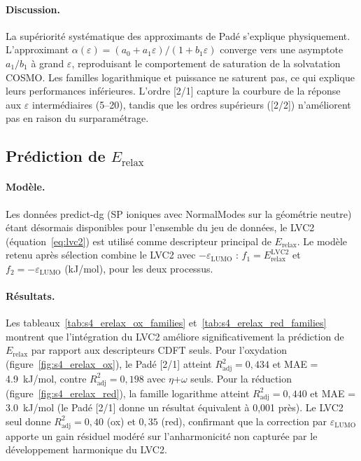 \paragraph{Discussion.}
La supériorité systématique des approximants de Padé s'explique physiquement. L'approximant $\alpha(\varepsilon) = (a_0 + a_1\varepsilon)/(1 + b_1\varepsilon)$ converge vers une asymptote $a_1/b_1$ à grand $\varepsilon$, reproduisant le comportement de saturation de la solvatation COSMO. Les familles logarithmique et puissance ne saturent pas, ce qui explique leurs performances inférieures. L'ordre [2/1] capture la courbure de la réponse aux $\varepsilon$ intermédiaires (5--20), tandis que les ordres supérieurs ([2/2]) n'améliorent pas en raison du surparamétrage.

\subsection{Prédiction de \texorpdfstring{$E_{\text{relax}}$}{Erelax}}
\label{subsec:s4_erelax}

\paragraph{Modèle.}
Les données predict-dg (SP ioniques avec NormalModes sur la géométrie neutre) étant désormais disponibles pour l'ensemble du jeu de données, le LVC2 (équation~\ref{eq:lvc2}) est utilisé comme descripteur principal de $E_\text{relax}$. Le modèle retenu après sélection combine le LVC2 avec $-\varepsilon_\text{LUMO}$ : $f_1 = E_\text{relax}^\text{LVC2}$ et $f_2 = -\varepsilon_\text{LUMO}$ (kJ/mol), pour les deux processus.

\paragraph{Résultats.}
Les tableaux~\ref{tab:s4_erelax_ox_families} et~\ref{tab:s4_erelax_red_families} montrent que l'intégration du LVC2 améliore significativement la prédiction de $E_\text{relax}$ par rapport aux descripteurs CDFT seuls. Pour l'oxydation (figure~\ref{fig:s4_erelax_ox}), le Padé [2/1] atteint $R^2_\text{adj} = 0{,}434$ et MAE = \SI{4.9}{kJ/mol}, contre $R^2_\text{adj} = 0{,}198$ avec $\eta$+$\omega$ seuls. Pour la réduction (figure~\ref{fig:s4_erelax_red}), la famille logarithme atteint $R^2_\text{adj} = 0{,}440$ et MAE = \SI{3.0}{kJ/mol} (le Padé [2/1] donne un résultat équivalent à 0,001 près). Le LVC2 seul donne $R^2_\text{adj} = 0{,}40$ (ox) et $0{,}35$ (red), confirmant que la correction par $\varepsilon_\text{LUMO}$ apporte un gain résiduel modéré sur l'anharmonicité non capturée par le développement harmonique du LVC2.

